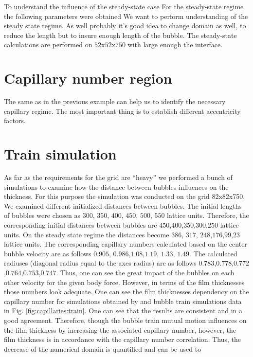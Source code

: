\documentclass{article}
\begin{document}
To understand the influence of the steady-state case
For the steady-state regime the following parameters were obtained
We want to perform understanding of the steady state regime. As well probably it's good idea to
change domain as well, to reduce the length but to insure enough length of the bubble. The
steady-state calculations are performed on $52\mathrm{x}52\mathrm{x}750$ with large enough the
interface. 

\section{Capillary number region}
The same as in the previous example can help us to identify the necessary capillary regime. The
most important thing is to establish different accentricity factors.

\section{Train simulation}
\label{section:bubble:train}
As far as the requirements for the grid are ``heavy'' we performed a bunch of simulations to
examine how the distance between bubbles influences on the thickness. For this purpose the
simulation was conducted on the grid 82x82x750. We examined different initialized distances between
bubbles. The initial lengths of bubbles were chosen as $300$, $350$, $400$, $450$, $500$, $550$
lattice units. Therefore, the corresponding initial distances between bubbles are
$450$,$400$,$350$,$300$,$250$ lattice units. On the steady state regime the distances become $386$,
$317$, $248$,$176$,$99$,$23$ lattice units. The corresponding capillary numbers calculated based on
the center bubble velocity are as follows $0.905$, $0.986$,$1.08$,$1.19$, $1.33$, $1.49$. The
calculated radiuses (diagonal radius equal to the axes radius) are as follows
$0.783$,$0.778$,$0.772$,$0.764$,$0.753$,$0.747$. Thus, one can see the great impact of the bubbles
on each other velocity for the given body force. However, in terms of the film thicknesses those
numbers look adequate. One can see the film thicknesses dependency on the capillary number for
simulations obtained by \citet{heil-threedim} and bubble train simulations data in Fig.
\ref{fig:capillaries:train}. One can see that the results are consistent and in a good agreement.
Therefore, though the bubble train mutual motion influences on the film thickness by increasing the
associated capillary number,  however, the film thickness is in accordance with the capillary
number correlation. Thus, the decrease of the numerical domain is quantified and can be used to
\end{document}
